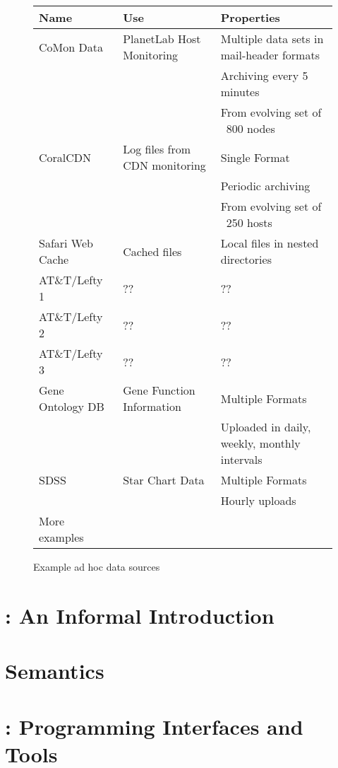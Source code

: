 \documentclass[nocopyrightspace]{sigplanconf}
\begin{document}
\begin{figure*}
\begin{center}
\begin{tabular}{|l|l|l|}
\hline\hline
Name & Use & Properties 
\\\hline\hline
CoMon Data & PlanetLab Host Monitoring & Multiple data sets in mail-header formats\\
                                       && Archiving every 5 minutes \\
                                       && From evolving set of ~800 nodes \\\hline
CoralCDN & Log files from CDN monitoring & Single Format \\
                                       && Periodic archiving \\
                                       && From evolving set of ~250 hosts \\\hline
Safari Web Cache & Cached files        & Local files in nested directories \\\hline
AT\&T/Lefty 1 & ?? & ?? \\\hline
AT\&T/Lefty 2 & ?? & ?? \\\hline
AT\&T/Lefty 3 & ?? & ?? \\\hline
Gene Ontology DB & Gene Function Information & Multiple Formats \\
                                             && Uploaded in daily, weekly, monthly intervals \\\hline
SDSS & Star Chart Data & Multiple Formats \\
                       && Hourly uploads \\\hline
More examples & & \\
\hline\hline
\end{tabular}
\end{center}
\caption{Example ad hoc data sources}
\label{fig:exampledata}
\end{figure*}

\section{\padsd{}: An Informal Introduction}
\label{sec:informal}

\section{\padsd{} Semantics}
\label{sec:semantics}


\section{\padsd{}:  Programming Interfaces and Tools}
\label{sec:programming}
\end{document}
